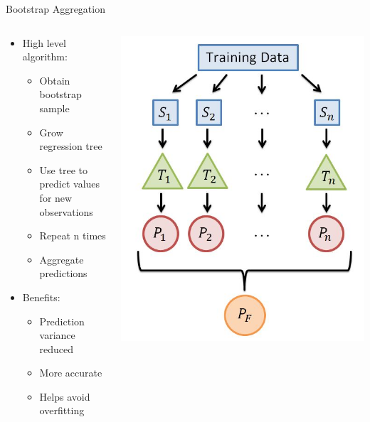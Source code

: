 \documentclass{beamer}
\begin{document}
	\begin{frame}{Bootstrap Aggregation}
		\begin{columns}
			\begin{column}{0.5\textwidth}
				\begin{itemize}
					\item High level algorithm:
					\begin{itemize}
						\item Obtain bootstrap sample
						\item Grow regression tree
						\item Use tree to predict values\\
						for new observations
						\item Repeat n times
						\item Aggregate predictions 
					\end{itemize}
					\item Benefits:
					\begin{itemize}
						\item Prediction variance reduced
						\item More accurate
						\item Helps avoid overfitting
					\end{itemize}
				\end{itemize}
			\end{column}
			\begin{column}{0.5\textwidth}
				\includegraphics[scale=.4]{baggingalg.jpg}
			\end{column}
		\end{columns}
	\end{frame}
\end{document}

